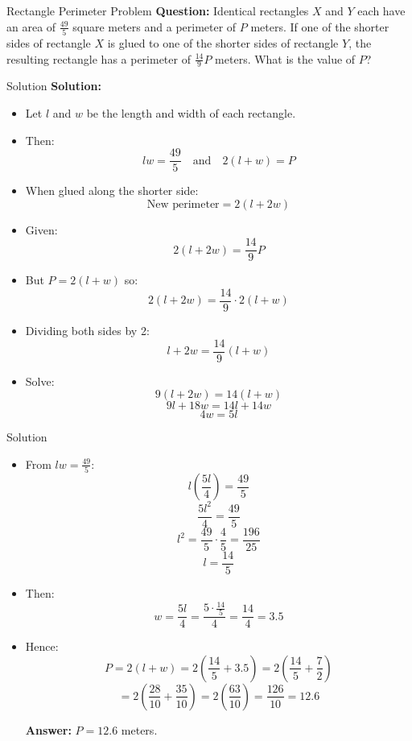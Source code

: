 \documentclass{beamer}
\begin{document}
\begin{frame}{Rectangle Perimeter Problem}
\textbf{Question:}
Identical rectangles \(X\) and \(Y\) each have an area of \(\frac{49}{5}\) square meters and a perimeter of \(P\) meters. If one of the shorter sides of rectangle \(X\) is glued to one of the shorter sides of rectangle \(Y\), the resulting rectangle has a perimeter of \(\frac{14}{9}P\) meters. What is the value of \(P\)?
\end{frame}



\begin{frame}{Solution}
\footnotesize
\textbf{Solution:}
\begin{itemize}
    \item Let \(l\) and \(w\) be the length and width of each rectangle.
    \item Then:
    \[
    lw = \frac{49}{5} \quad \text{and} \quad 2(l+w) = P
    \]
    \item When glued along the shorter side:
    \[
    \text{New perimeter} = 2(l + 2w)
    \]
    \item Given:
    \[
    2(l + 2w) = \frac{14}{9}P
    \]
    \item But \(P = 2(l+w)\) so:
    \[
    2(l + 2w) = \frac{14}{9} \cdot 2(l+w)
    \]
    \item Dividing both sides by 2:
    \[
    l + 2w = \frac{14}{9}(l+w)
    \]
    \item Solve:
    \[
    9(l + 2w) = 14(l + w)
    \]
    \[
    9l + 18w = 14l + 14w
    \]
    \[
    4w = 5l
    \]
  \end{itemize}
\end{frame}

\begin{frame}{Solution}

\footnotesize

\begin{itemize}
      \item From \(lw = \frac{49}{5}\):
    \[
    l \left(\frac{5l}{4}\right) = \frac{49}{5}
    \]
    \[
    \frac{5l^2}{4} = \frac{49}{5}
    \]
    \[
    l^2 = \frac{49}{5} \cdot \frac{4}{5} = \frac{196}{25}
    \]
    \[
    l = \frac{14}{5}
    \]
    \item Then:
    \[
    w = \frac{5l}{4} = \frac{5 \cdot \frac{14}{5}}{4} = \frac{14}{4} = 3.5
    \]
    \item Hence:
    \[
    P = 2(l + w) = 2\left(\frac{14}{5} + 3.5\right) = 2\left(\frac{14}{5} + \frac{7}{2}\right)
    \]
    \[
    = 2\left(\frac{28}{10} + \frac{35}{10}\right) = 2\left(\frac{63}{10}\right) = \frac{126}{10} = 12.6
    \]
    
\textbf{Answer:} \( P = 12.6 \) meters.
\end{itemize}


\end{frame}
\end{document}
